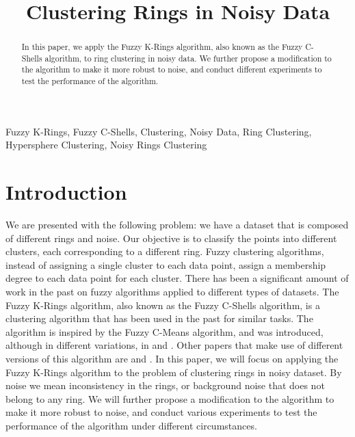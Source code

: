 \documentclass[conference]{IEEEtran}
\begin{document}
\title{Clustering Rings in Noisy Data}

\author{

}
\maketitle

\begin{abstract}
In this paper, we apply the Fuzzy K-Rings algorithm, also known as the Fuzzy C-Shells algorithm, to ring clustering in noisy data.
We further propose a modification to the algorithm to make it more robust to noise, and conduct different experiments to test the performance of the algorithm.
\end{abstract}

\begin{IEEEkeywords}
Fuzzy K-Rings, Fuzzy C-Shells, Clustering, Noisy Data, Ring Clustering, Hypersphere Clustering, Noisy Rings Clustering
\end{IEEEkeywords}

\section{Introduction}
We are presented with the following problem: we have a dataset that is composed of different rings and noise. Our objective is to classify the points into different clusters,
each corresponding to a different ring. Fuzzy clustering algorithms, instead of assigning a single cluster to each data point, assign a membership degree to each data point for each cluster. There has been a significant
amount of work in the past on fuzzy algorithms applied to different types of datasets. The Fuzzy K-Rings algorithm, also known as the Fuzzy C-Shells algorithm, is a clustering algorithm that has been used in the past
for similar tasks. The algorithm is inspired by the Fuzzy C-Means algorithm, and was introduced, although in different variations, in \cite{308484} and \cite{DAVE1992713}. Other papers that make use of different versions
of this algorithm are \cite{Pratiwi_2020} and \cite{159056}.
In this paper, we will focus on applying the Fuzzy K-Rings algorithm to the problem of clustering rings in noisy dataset. By noise we mean inconsistency in the rings, or background noise that does not belong to any ring.
We will further propose a modification to the algorithm to make it more robust to noise, and conduct various experiments to test the performance of the algorithm under different circumstances.
\end{document}
